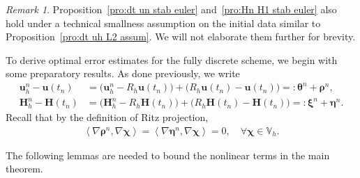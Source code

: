 \documentclass[11pt, reqno]{amsart}
\theoremstyle{definition}
\theoremstyle{remark}
\newtheorem{remark}[theorem]{Remark}
\numberwithin{equation}{section}
\newcommand{\bff}{\boldsymbol}
\newcommand{\bb}{\mathbb}
\newcommand{\inpro}[2]{\left\langle#1,#2\right\rangle}
\begin{document}
\begin{remark}
Proposition~\ref{pro:dt un stab euler} and~\ref{pro:Hn H1 stab euler} also hold under a technical smallness assumption on the initial data similar to Proposition~\ref{pro:dt uh L2 assum}. We will not elaborate them further for brevity.
\end{remark}

To derive optimal error estimates for the fully discrete scheme, we begin with some preparatory results. As done previously, we write
\begin{align}
	\label{equ:Un utn}
	\bff{u}_h^n-\bff{u}(t_n)
	&=
	\big(\bff{u}_h^n- R_h\bff{u}(t_n) \big)
	+
	\big(R_h \bff{u}(t_n)-\bff{u}(t_n) \big)
	=:
	\bff{\theta}^n + \bff{\rho}^n,
	\\
	\label{equ:Hn Htn}
	\bff{H}_h^n-\bff{H}(t_n)
	&=
	\big(\bff{H}_h^n- R_h\bff{H}(t_n) \big)
	+
	\big(R_h \bff{H}(t_n)-\bff{H}(t_n) \big)
	=:
	\bff{\xi}^n + \bff{\eta}^n.
\end{align}
Recall that by the definition of Ritz projection,
\begin{align}\label{equ:nab Ritz disc}
	\inpro{\nabla \bff{\rho}^n}{\nabla \bff{\chi}}
	=
	\inpro{\nabla \bff{\eta}^n}{\nabla \bff{\chi}}
	=
	0,
	\quad\forall \bff{\chi} \in \bb{V}_h.
\end{align}

The following lemmas are needed to bound the nonlinear terms in the main theorem.
\end{document}
